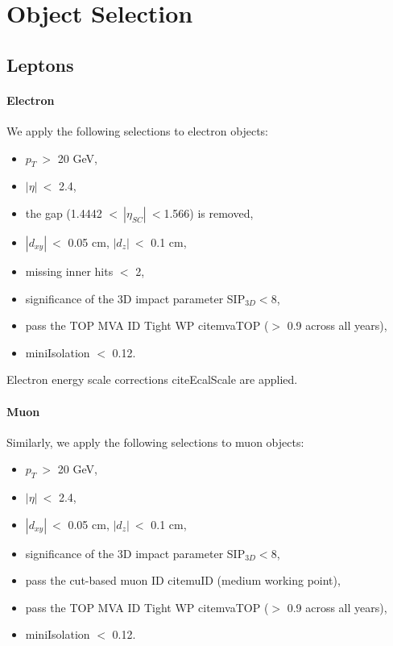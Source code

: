 \chapter{Object Selection}
\label{chap:Objects}

\section{Leptons}
\label{sec:Leptons}

\subsubsection{Electron}
We apply the following selections to electron objects:

\begin{itemize}
\item $p_{T}~>$ 20 GeV,
\item $|\eta|~<$ 2.4,
\item the gap (1.4442 $<~|\eta_{SC}|~<$1.566) is removed,
\item $|d_{xy}|~<$ 0.05 cm, $|d_{z}|~<$ 0.1 cm,
\item missing inner hits $<$ 2,
\item significance of the 3D impact parameter SIP$_{3D}<$8,
\item pass the TOP MVA ID Tight WP cite{mvaTOP} ($>$ 0.9 across all years),
\item miniIsolation $<$ 0.12.
\end{itemize}

Electron energy scale corrections cite{EcalScale} are applied.

\subsubsection{Muon}
Similarly, we apply the following selections to muon objects:

\begin{itemize}
\item $p_{T}~>$ 20 GeV,
\item $|\eta|~<$ 2.4,
\item $|d_{xy}|~<$ 0.05 cm, $|d_{z}|~<$ 0.1 cm,
\item significance of the 3D impact parameter SIP$_{3D}<$8,
\item pass the cut-based muon ID cite{muID} (medium working point),
\item pass the TOP MVA ID Tight WP cite{mvaTOP} ($>$ 0.9 across all years),
\item miniIsolation $<$ 0.12.
\end{itemize}

